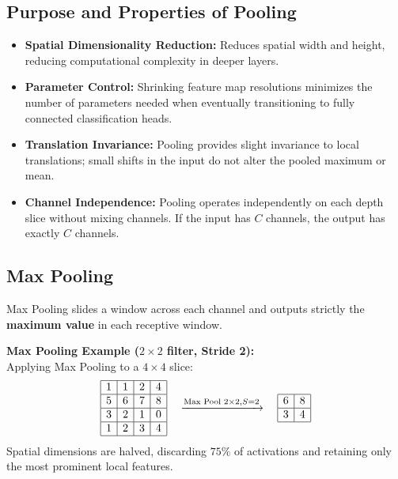 \subsection{Purpose and Properties of Pooling}
\begin{itemize}[nosep, leftmargin=*]
    \item \textbf{Spatial Dimensionality Reduction:} Reduces spatial width and height, reducing computational complexity in deeper layers.
    \item \textbf{Parameter Control:} Shrinking feature map resolutions minimizes the number of parameters needed when eventually transitioning to fully connected classification heads.
    \item \textbf{Translation Invariance:} Pooling provides slight invariance to local translations; small shifts in the input do not alter the pooled maximum or mean.
    \item \textbf{Channel Independence:} Pooling operates independently on each depth slice without mixing channels. If the input has $C$ channels, the output has exactly $C$ channels.
\end{itemize}

\subsection{Max Pooling}
Max Pooling slides a window across each channel and outputs strictly the \textbf{maximum value} in each receptive window.

\begin{examplebox}
\textbf{Max Pooling Example ($2 \times 2$ filter, Stride 2):}\\
Applying Max Pooling to a $4 \times 4$ slice:
\[
\begin{array}{|c|c|c|c|}
\hline
1 & 1 & 2 & 4 \\ \hline
5 & 6 & 7 & 8 \\ \hline
3 & 2 & 1 & 0 \\ \hline
1 & 2 & 3 & 4 \\ \hline
\end{array}
\quad \xrightarrow{\text{Max Pool } 2 \times 2, S=2} \quad
\begin{array}{|c|c|}
\hline
6 & 8 \\ \hline
3 & 4 \\ \hline
\end{array}
\]
Spatial dimensions are halved, discarding $75\%$ of activations and retaining only the most prominent local features.
\end{examplebox}

